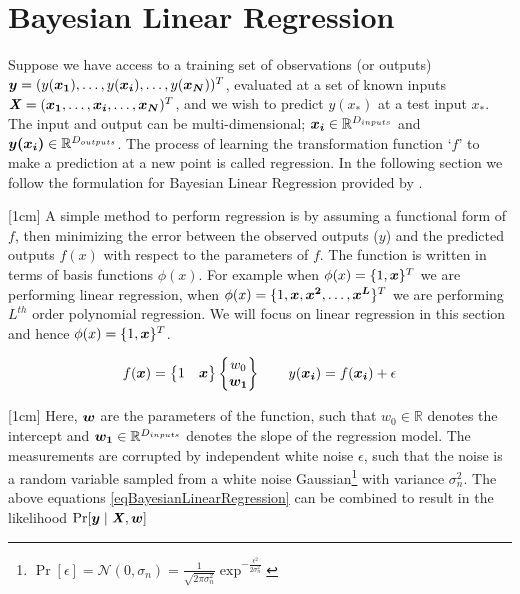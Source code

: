 \section{Bayesian Linear Regression}\label{secBayesianModelling}
\sloppy Suppose we have access to a training set of observations (or outputs) $\boldsymbol{y} = (y(\boldsymbol{x_{1}}), \ldots , y(\boldsymbol{x_{i}}), \ldots , y(\boldsymbol{x_{N}}))^T$, evaluated at a set of known inputs $\bm{\mathit{X}} = (\boldsymbol{x_{1}}, \ldots , \boldsymbol{x_{i}}, \ldots, \boldsymbol{x_{N}})^T$, and we wish to predict $y(x_{*})$ at a test input $x_{*}$. The input and output can be multi-dimensional; $\boldsymbol{x_{i}} \in \mathbb{R}^{D_{inputs}}$ and $\boldsymbol{y(x_{i})} \in \mathbb{R}^{D_{outputs}}$. The process of learning the transformation function `$f$' to make a prediction at a new point is called regression. In the following section we follow the formulation for Bayesian Linear Regression provided by \cite{mackay2003information}.

[1cm]
A simple method to perform regression is by assuming a functional form of $f$, then minimizing the error between the observed outputs ($y$) and the predicted outputs $f(x)$ with respect to the parameters of $f$. The function is written in terms of basis functions $\phi(x)$. For example when $\phi(x) = \{1, \boldsymbol{x}\}^{T}$ we are performing linear regression, when $\phi(x) = \{1, \boldsymbol{x}, \boldsymbol{x^{2}}, \ldots, \boldsymbol{x^{L}}\}^{T}$ we are performing $L^{th}$ order polynomial regression. We will focus on linear regression in this section and hence $\phi(x) = \{1, \boldsymbol{x}\}^{T}$.

\begin{equation}\label{eqBayesianLinearRegression}
f(\boldsymbol{x}) = \begin{Bmatrix}
1 & \boldsymbol{x}
\end{Bmatrix}  \begin{Bmatrix}
w_{0}\\ 
\boldsymbol{w_{1}}
\end{Bmatrix}
\quad \quad y(\boldsymbol{x_{i}}) = f(\boldsymbol{x_{i}}) + \epsilon
\end{equation}

[1cm]
Here, $\boldsymbol{w}$ are the parameters of the function, such that $w_{0} \in \mathbb{R}$ denotes the intercept and $\boldsymbol{w_{1}} \in \mathbb{R}^{D_{inputs}}$ denotes the slope of the regression model. The measurements are corrupted by independent white noise $\epsilon$, such that the noise is a random variable sampled from a white noise Gaussian\footnote{$\Pr[\epsilon] = \mathcal{N}(0, \sigma_{n}) = \frac{1}{\sqrt{2\pi\sigma_{n}^{2}}}\exp^{-\frac{\epsilon^{2}}{2\sigma_{n}^{2}}}
$} with variance $\sigma_{n}^{2}$. The above equations \ref{eqBayesianLinearRegression} can be combined to result in the likelihood $\Pr[\boldsymbol{y} \mid \bm{\mathit{X}}, \boldsymbol{w}]$

